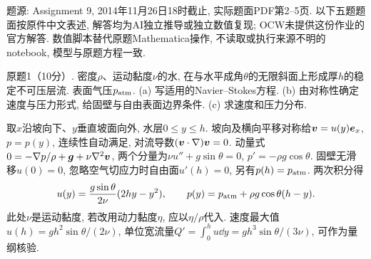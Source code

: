 \label{chap:cm-pset9}
题源: Assignment 9, 2014年11月26日18时截止, 实际题面PDF第2--5页. 以下五题题面按原件中文表述, 解答均为AI独立推导或独立数值复现; OCW未提供这份作业的官方解答. 数值脚本替代原题Mathematica操作, 不读取或执行来源不明的notebook, 模型与原题方程一致.

\begin{exercise}
原题1（10分）. 密度$\rho$、运动黏度$\nu$的水, 在与水平成角$\theta$的无限斜面上形成厚$h$的稳定不可压层流. 表面气压$p_{\rm atm}$. (a) 写适用的Navier--Stokes方程. (b) 由对称性确定速度与压力形式, 给固壁与自由表面边界条件. (c) 求速度和压力分布.
\end{exercise}
\begin{solution}
取$x$沿坡向下、$y$垂直坡面向外, 水层$0\le y\le h$. 坡向及横向平移对称给$\boldsymbol{v}=u(y)\boldsymbol{e}_x$, $p=p(y)$, 连续性自动满足, 对流导数$(\boldsymbol{v}\cdot\nabla)\boldsymbol{v}=0$. 动量式$0=-\nabla p/\rho+\boldsymbol{g}+\nu\nabla^2\boldsymbol{v}$, 两个分量为$\nu u''+g\sin\theta=0$, $p'=-\rho g\cos\theta$. 固壁无滑移$u(0)=0$, 忽略空气切应力时自由面$u'(h)=0$, 另有$p(h)=p_{\rm atm}$. 两次积分得
\[
u(y)=\frac{g\sin\theta}{2\nu}(2hy-y^2),\qquad
p(y)=p_{\rm atm}+\rho g\cos\theta(h-y).
\]
此处$\nu$是运动黏度, 若改用动力黏度$\eta$, 应以$\eta/\rho$代入. 速度最大值$u(h)=gh^2\sin\theta/(2\nu)$, 单位宽流量$Q'=\int_0^h u\dd y=gh^3\sin\theta/(3\nu)$, 可作为量纲核验.
\end{solution}

